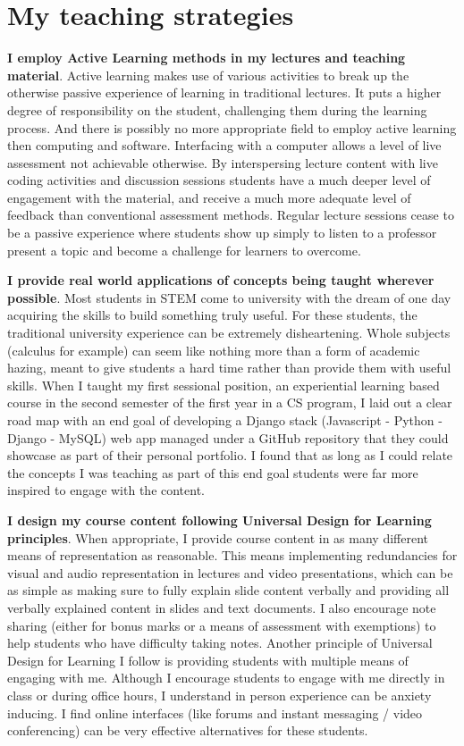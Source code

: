 \documentclass{article}
\begin{document}
\section{My teaching strategies}
\label{sec:orge7ee2b8}

\textbf{I employ Active Learning methods in my lectures and teaching material}.
Active learning makes use of various activities to break up the otherwise
passive experience of learning in traditional lectures. It puts a higher
degree of responsibility on the student, challenging them during the learning
process. And there is possibly no more appropriate field to employ active
learning then computing and software. Interfacing with a computer allows a
level of live assessment not achievable otherwise. By interspersing lecture
content with live coding activities and discussion sessions students have a
much deeper level of engagement with the material, and receive a much more
adequate level of feedback than conventional assessment methods. Regular
lecture sessions cease to be a passive experience where students show up
simply to listen to a professor present a topic and become a challenge for
learners to overcome.

\noindent
\textbf{I provide real world applications of concepts being taught wherever
possible}. Most students in STEM come to university with the dream of one day
acquiring the skills to build something truly useful. For these students, the
traditional university experience can be extremely disheartening. Whole
subjects (calculus for example) can seem like nothing more than a form of
academic hazing, meant to give students a hard time rather than provide them
with useful skills. When I taught my first sessional position, an experiential
learning based course in the second semester of the first year in a CS
program, I laid out a clear road map with an end goal of developing a Django
stack (Javascript - Python - Django - MySQL) web app managed under a GitHub
repository that they could showcase as part of their personal portfolio. I
found that as long as I could relate the concepts I was teaching as part of
this end goal students were far more inspired to engage with the content.

\noindent
\textbf{I design my course content following Universal Design for Learning
principles}. When appropriate, I provide course content in as many different
means of representation as reasonable. This means implementing redundancies
for visual and audio representation in lectures and video presentations, which
can be as simple as making sure to fully explain slide content verbally and
providing all verbally explained content in slides and text documents. I also
encourage note sharing (either for bonus marks or a means of assessment with
exemptions) to help students who have difficulty taking notes. Another
principle of Universal Design for Learning I follow is providing students with
multiple means of engaging with me. Although I encourage students to engage
with me directly in class or during office hours, I understand in person
experience can be anxiety inducing. I find online interfaces (like forums and
instant messaging / video conferencing) can be very effective alternatives for
these students.
\end{document}

